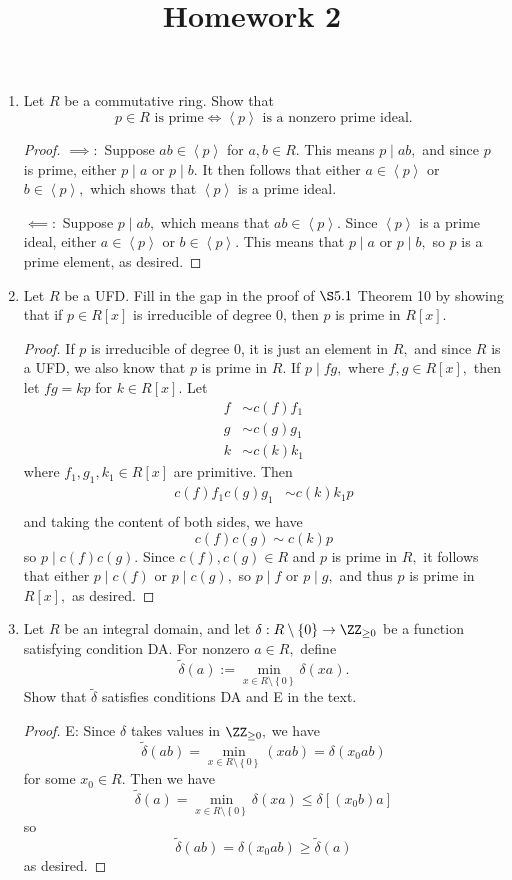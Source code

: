 \documentclass{article}
\begin{document}
\title{Homework 2}
\maketitle
\thispagestyle{fancy}

\begin{enumerate}
	\item Let $R$ be a commutative ring. Show that
		\[p\in R\text{ is prime} \iff \left< p\right>\text{ is a nonzero prime ideal.}\]
		\begin{proof}
			$\implies: $ Suppose $ab\in\left< p\right>$ for $a, b\in R.$ This means $p\mid ab,$ and since $p$ is prime, either $p\mid a$ or $p\mid b.$ It then follows that either $a\in \left< p\right>$ or $b\in \left< p\right>,$ which shows that $\left< p\right>$ is a prime ideal.

			$\impliedby: $ Suppose $p\mid ab,$ which means that $ab\in \left< p\right>.$ Since $\left< p\right>$ is a prime ideal, either $a\in \left< p\right>$ or $b\in\left< p\right>.$ This means that $p\mid a$ or $p\mid b,$ so $p$ is a prime element, as desired.
		\end{proof}

	\item Let $R$ be a UFD. Fill in the gap in the proof of $\S5.1$ Theorem 10 by showing that if $p\in R[x]$ is irreducible of degree 0, then $p$ is prime in $R[x].$
		\begin{proof}
			If $p$ is irreducible of degree 0, it is just an element in $R,$ and since $R$ is a UFD, we also know that $p$ is prime in $R.$ If $p\mid fg,$ where $f, g\in R[x],$ then let $fg=kp$ for $k\in R[x].$ Let
			\begin{align*}
				f &\sim c(f) f_1 \\
				g &\sim c(g) g_1 \\
				k &\sim c(k)k_1
			\end{align*}
			where $f_1, g_1, k_1\in R[x]$ are primitive. Then
			\begin{align*}
				c(f)f_1c(g)g_1 &\sim c(k) k_1 p \\
			\end{align*}
			and taking the content of both sides, we have
			\[c(f)c(g) \sim c(k)p\]
			so $p\mid c(f) c(g).$ Since $c(f), c(g)\in R$ and $p$ is prime in $R,$ it follows that either $p\mid c(f)$ or $p\mid c(g),$ so $p\mid f$ or $p\mid g,$ and thus $p$ is prime in $R[x],$ as desired.
		\end{proof}

	\item Let $R$ be an integral domain, and let $\delta:R\setminus\left\{ 0 \right\}\to\ZZ_{\ge0}$ be a function satisfying condition DA. For nonzero $a\in R,$ define
		\[\tilde{\delta}(a):=\min_{x\in R\setminus\left\{ 0 \right\}} \delta(xa).\]
		Show that $\tilde{\delta}$ satisfies conditions DA and E in the text.
		\begin{proof}
			E: Since $\delta$ takes values in $\ZZ_{\ge0},$ we have
			\[\tilde\delta(ab)=\min_{x\in R\setminus\left\{ 0 \right\}}(xab) = \delta(x_0 ab)\]
			for some $x_0\in R.$ Then we have
			\[\tilde\delta(a) = \min_{x\in R\setminus\left\{ 0 \right\}} \delta(xa)\le \delta[(x_0b)a]\]
			so
			\[\tilde\delta(ab)=\delta(x_0ab)\ge \tilde\delta(a)\]
			as desired.


\end{proof}
\end{enumerate}
\end{document}
